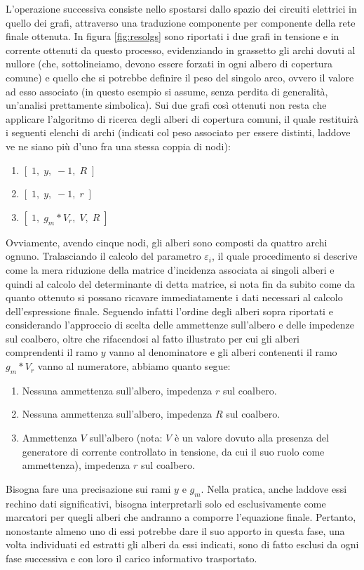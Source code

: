 L'operazione successiva consiste nello spostarsi dallo spazio dei circuiti elettrici in quello dei grafi, attraverso una traduzione componente per componente della rete finale ottenuta. In figura \ref{fig:resolgs} sono riportati i due grafi in tensione e in corrente ottenuti da questo processo, evidenziando in grassetto gli archi dovuti al nullore (che, sottolineiamo, devono essere forzati in ogni albero di copertura comune) e quello che si potrebbe definire il peso del singolo arco, ovvero il valore ad esso associato (in questo esempio si assume, senza perdita di generalità, un'analisi prettamente simbolica). Sui due grafi così ottenuti non resta che applicare l'algoritmo di ricerca degli alberi di copertura comuni, il quale restituirà i seguenti elenchi di archi (indicati col peso associato per essere distinti, laddove ve ne siano più d'uno fra una stessa coppia di nodi):
\begin{enumerate}
 \item $ \left[\; 1,\; y,\; -1,\; R\;\right] $
 \item $ \left[\; 1,\; y,\; -1,\; r\;\right] $
 \item $ \left[\; 1,\; g_m * V_r,\; V,\; R\;\right] $
\end{enumerate}
Ovviamente, avendo cinque nodi, gli alberi sono composti da quattro archi ognuno. Tralasciando il calcolo del parametro $\varepsilon_i$, il quale procedimento si descrive come la mera riduzione della matrice d'incidenza associata ai singoli alberi e quindi al calcolo del determinante di detta matrice, si nota fin da subito come da quanto ottenuto si possano ricavare immediatamente i dati necessari al calcolo dell'espressione finale. Seguendo infatti l'ordine degli alberi sopra riportati e considerando l'approccio di scelta delle ammettenze sull'albero e delle impedenze sul coalbero, oltre che rifacendosi al fatto illustrato per cui gli alberi comprendenti il ramo $y$ vanno al denominatore e gli alberi contenenti il ramo $g_m * V_r$ vanno al numeratore, abbiamo quanto segue:
\begin{enumerate}
 \item Nessuna ammettenza sull'albero, impedenza $r$ sul coalbero.
 \item Nessuna ammettenza sull'albero, impedenza $R$ sul coalbero.
 \item Ammettenza $V$ sull'albero (nota: $V$ è un valore dovuto alla presenza del generatore di corrente controllato in tensione, da cui il suo ruolo come ammettenza), impedenza $r$ sul coalbero.
\end{enumerate}
Bisogna fare una precisazione sui rami $y$ e $g_m$. Nella pratica, anche laddove essi rechino dati significativi, bisogna interpretarli solo ed esclusivamente come marcatori per quegli alberi che andranno a comporre l'equazione finale. Pertanto, nonostante almeno uno di essi potrebbe dare il suo apporto in questa fase, una volta individuati ed estratti gli alberi da essi indicati, sono di fatto esclusi da ogni fase successiva e con loro il carico informativo trasportato.


